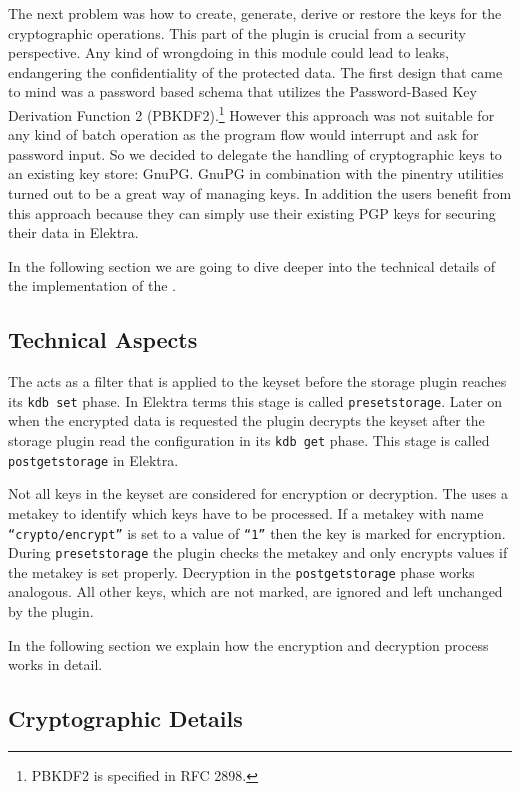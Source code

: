 The next problem was how to create, generate, derive or restore the keys for the cryptographic operations.
This part of the plugin is crucial from a security perspective.
Any kind of wrongdoing in this module could lead to leaks, endangering the confidentiality of the protected data.
The first design that came to mind was a password based schema that utilizes the Password-Based Key Derivation Function 2 (PBKDF2).\footnote{PBKDF2 is specified in RFC 2898.}
However this approach was not suitable for any kind of batch operation as the program flow would interrupt and ask for password input.
So we decided to delegate the handling of cryptographic keys to an existing key store: GnuPG.
GnuPG in combination with the pinentry utilities turned out to be a great way of managing keys.
In addition the users benefit from this approach because they can simply use their existing PGP keys for securing their data in Elektra.

In the following section we are going to dive deeper into the technical
details of the implementation of the \crypto.

\subsection{Technical Aspects}

The \crypto{} acts as a filter that is applied to the keyset before the storage plugin reaches its \texttt{kdb set} phase.
In Elektra terms this stage is called \texttt{presetstorage}.
Later on when the encrypted data is requested the plugin decrypts the keyset after the storage plugin read the configuration in its \texttt{kdb get} phase.
This stage is called \texttt{postgetstorage} in Elektra.

Not all keys in the keyset are considered for encryption or decryption.
The \crypto{} uses a metakey to identify which keys have to be processed.
If a metakey with name \texttt{``crypto/encrypt''} is set to a value of \texttt{``1''} then the key is marked for encryption.
During \texttt{presetstorage} the plugin checks the metakey and only encrypts values if the metakey is set properly.
Decryption in the \texttt{postgetstorage} phase works analogous.
All other keys, which are not marked, are ignored and left unchanged by the plugin.

In the following section we explain how the encryption and decryption process works in detail.

\subsection{Cryptographic Details}

